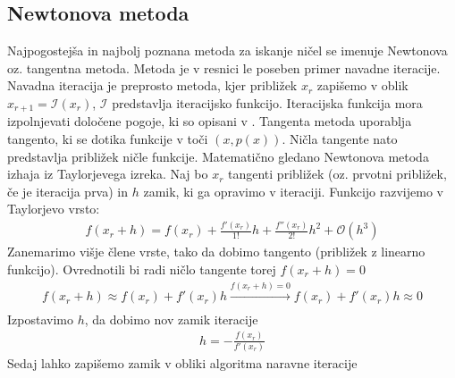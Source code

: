 \subsection{Newtonova metoda}
Najpogostejša in najbolj poznana metoda za iskanje ničel se imenuje Newtonova oz. tangentna metoda. Metoda je v resnici le poseben primer navadne iteracije. Navadna iteracija je preprosto metoda, kjer približek $x_r$ zapišemo v oblik $x_{r+1} = \mathcal{I}(x_r)$, $\mathcal{I}$ predstavlja iteracijsko funkcijo. Iteracijska funkcija mora izpolnjevati določene pogoje, ki so opisani v \cite{Plestenjak2010}. Tangenta metoda uporablja tangento, ki se dotika funkcije v toči $(x, p(x))$. Ničla tangente nato predstavlja približek ničle funkcije. Matematično gledano Newtonova metoda izhaja iz Taylorjevega izreka. Naj bo $x_r$ tangenti približek (oz. prvotni približek, če je iteracija prva) in $h$ zamik, ki ga opravimo v iteraciji. Funkcijo razvijemo v Taylorjevo vrsto:
\begin{align}
    f(x_r + h) = f(x_r) + \frac{f'(x_r)}{1!}h + \frac{f''(x_r)}{2!}h^2 + \mathcal{O}(h^3)
\end{align}
Zanemarimo višje člene vrste, tako da dobimo tangento (približek z linearno funkcijo). Ovrednotili bi radi ničlo tangente torej $ f(x_r + h) = 0$
\begin{align}
    f(x_r + h) \approx f(x_r) + f'(x_r)h  \xrightarrow[]{f(x_r + h) = 0} f(x_r) + f'(x_r)h \approx 0
\end{align}
Izpostavimo $h$, da dobimo nov zamik iteracije
\begin{align}
    h = -\frac{f(x_r)}{f'(x_r)}
\end{align}
Sedaj lahko zapišemo zamik v obliki algoritma naravne iteracije

